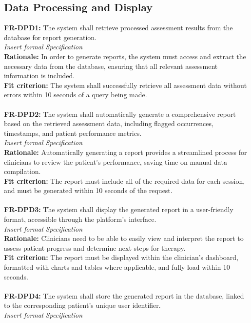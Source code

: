 \documentclass[12pt]{article}
\begin{document}
\subsection{Data Processing and Display}
\textbf{FR-DPD1: }The system shall retrieve processed assessment results from the database for report generation.\\
\textit{Insert formal Specification}\\
\textbf{Rationale: }In order to generate reports, the system must access and extract the necessary data from the database, ensuring that all relevant assessment information is included.\\
\textbf{Fit criterion: }The system shall successfully retrieve all assessment data without errors within 10 seconds of a query being made.\\
\\
\noindent\textbf{FR-DPD2: }The system shall automatically generate a comprehensive report based on the retrieved assessment data, including flagged occurrences, timestamps, and patient performance metrics.\\
\textit{Insert formal Specification}\\
\textbf{Rationale: }Automatically generating a report provides a streamlined process for clinicians to review the patient’s performance, saving time on manual data compilation.\\
\textbf{Fit criterion: }The report must include all of the required data for each session, and must be generated within 10 seconds of the request.\\
\\
\noindent\textbf{FR-DPD3: }The system shall display the generated report in a user-friendly format, accessible through the platform’s interface.\\
\textit{Insert formal Specification}\\
\textbf{Rationale: }Clinicians need to be able to easily view and interpret the report to assess patient progress and determine next steps for therapy.\\
\textbf{Fit criterion: }The report must be displayed within the clinician's dashboard, formatted with charts and tables where applicable, and fully load within 10 seconds.\\
\\
\noindent\textbf{FR-DPD4: }The system shall store the generated report in the database, linked to the corresponding patient’s unique user identifier.\\
\textit{Insert formal Specification}\\
\end{document}

